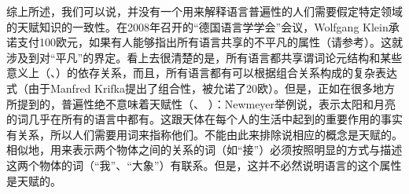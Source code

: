综上所述，我们可以说，并没有一个用来解释语言普遍性的人们需要假定特定领域的天赋知识的一致性。在2008年召开的“德国语言学学会”会议，Wolfgang Klein承诺支付100欧元，如果有人能够指出所有语言共享的不平凡的属性（请参考\citealp{Klein2009a}）。这就涉及到对“平凡”的界定。看上去很清楚的是，所有语言都共享谓词论元结构和某些意义上（\citealp[]{Hudson2010a}、\citealp[]{LR2010a}）的依存关系，而且，所有语言都有可以根据组合关系构成的复杂表达式（由于Manfred Krifka提出了组合性，被允诺了20欧）。但是，正如在很多地方所提到的，普遍性绝不意味着天赋性（\citealp[]{Bates84a}、
\citealp[]{Newmeyer2005a}）：Newmeyer举例说，表示太阳和月亮的词几乎在所有的语言中都有。这跟天体在每个人的生活中起到的重要作用的事实有关系，所以人们需要用词来指称他们。不能由此来排除说相应的概念是天赋的。相似地，用来表示两个物体之间的关系的词（如“接”）必须按照明显的方式与描述这两个物体的词（“我”、“大象”）有联系。但是，这并不必然说明语言的这个属性是天赋的。

